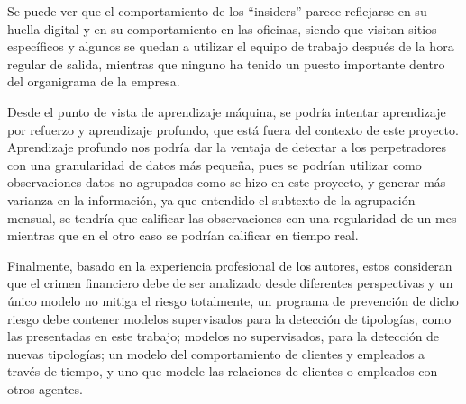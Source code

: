 \documentclass[runningheads]{llncs}
\begin{document}
Se puede ver que el comportamiento de los ``insiders'' parece reflejarse en su huella digital y en su comportamiento en las oficinas, siendo que visitan sitios específicos y algunos se quedan a utilizar el equipo de trabajo después de la hora regular de salida, mientras que ninguno ha tenido un puesto importante dentro del organigrama de la empresa.

Desde el punto de vista de aprendizaje máquina, se podría intentar aprendizaje por refuerzo y aprendizaje profundo, que está fuera del contexto de este proyecto. Aprendizaje profundo nos podría dar la ventaja de detectar a los perpetradores con una granularidad de datos más pequeña, pues se podrían utilizar como observaciones datos no agrupados como se hizo en este proyecto, y generar más varianza en la información, ya que entendido el subtexto de la agrupación mensual, se tendría que calificar las observaciones con una regularidad de un mes mientras que en el otro caso se podrían calificar en tiempo real. 

Finalmente, basado en la experiencia profesional de los autores, estos consideran que el crimen financiero debe de ser analizado desde diferentes perspectivas y un único modelo no mitiga el riesgo totalmente, un programa de prevención de dicho riesgo debe contener modelos supervisados para la detección de tipologías, como las presentadas en este trabajo; modelos no supervisados, para la detección de nuevas tipologías; un modelo del comportamiento de clientes y empleados a través de tiempo, y uno que modele las relaciones de clientes o empleados con otros agentes.



\end{document}
